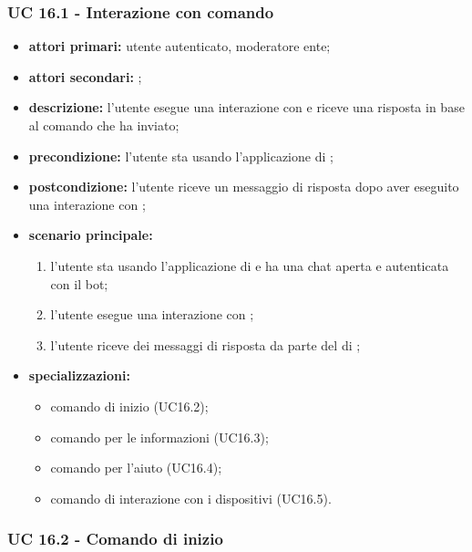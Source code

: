 	\subsubsection{UC 16.1 - Interazione con comando}

	\begin{itemize}
		\item \textbf{attori primari:} utente autenticato, moderatore ente;
		\item \textbf{attori secondari:} ;
		\item \textbf{descrizione:} l'utente esegue una interazione con  e riceve una risposta in base al comando che ha inviato;
		\item \textbf{precondizione:} l'utente sta usando l'applicazione di ;
		\item \textbf{postcondizione:} l'utente riceve un messaggio di risposta dopo aver eseguito una interazione con ;
		\item \textbf{scenario principale:}
		\begin{enumerate}
			\item l'utente sta usando l'applicazione di  e ha una chat aperta e autenticata con il bot;
			\item l'utente esegue una interazione con ;
			\item l'utente riceve dei messaggi di risposta da parte del  di ;
		\end{enumerate}
		\item \textbf{specializzazioni:}
		\begin{itemize}
			\item comando di inizio (UC16.2);
			\item comando per le informazioni (UC16.3);
			\item comando per l'aiuto (UC16.4);
			\item comando di interazione con i dispositivi (UC16.5).
		\end{itemize}
	\end{itemize}

	\subsubsection{UC 16.2 - Comando di inizio}


